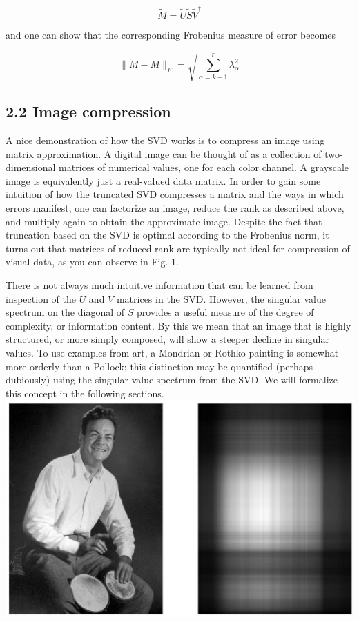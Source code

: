 \documentclass[12pt]{article}
\begin{document}
\begin{equation*}
\tilde{M}=\tilde{U} \tilde{S} \tilde{V}^{\dagger} \tag{2}
\end{equation*}


and one can show that the corresponding Frobenius measure of error becomes


\begin{equation*}
\|\tilde{M}-M\|_{F}=\sqrt{\sum_{\alpha=k+1}^{r} \lambda_{\alpha}^{2}} \tag{3}
\end{equation*}


\subsection*{2.2 Image compression}
A nice demonstration of how the SVD works is to compress an image using matrix approximation. A digital image can be thought of as a collection of two-dimensional matrices of numerical values, one for each color channel. A grayscale image is equivalently just a real-valued data matrix. In order to gain some intuition of how the truncated SVD compresses a matrix and the ways in which errors manifest, one can factorize an image, reduce the rank as described above, and multiply again to obtain the approximate image. Despite the fact that truncation based on the SVD is optimal according to the Frobenius norm, it turns out that matrices of reduced rank are typically not ideal for compression of visual data, as you can observe in Fig. 1.

There is not always much intuitive information that can be learned from inspection of the $U$ and $V$ matrices in the SVD. However, the singular value spectrum on the diagonal of $S$ provides a useful measure of the degree of complexity, or information content. By this we mean that an image that is highly structured, or more simply composed, will show a steeper decline in singular values. To use examples from art, a Mondrian or Rothko painting is somewhat more orderly than a Pollock; this distinction may be quantified (perhaps dubiously) using the singular value spectrum from the SVD. We will formalize this concept in the following sections.\\
\includegraphics[max width=\textwidth, center]{2024_04_17_aea350b0a5e2209a42f2g-03}
\end{document}
